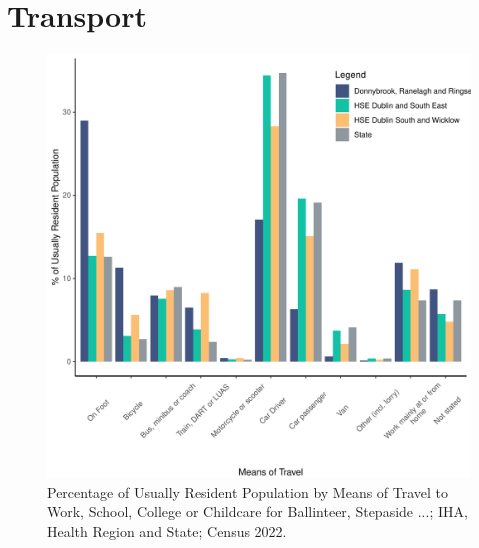 \documentclass{article}
\begin{document}
\section{Transport}\label{sect:Trans}
\begin{figure}[H]
	\centering
	\includegraphics[width = 120mm]{../figures/TravelED.pdf}
	\caption{Percentage of Usually Resident Population by Means of Travel to Work, School, College or Childcare for Ballinteer, Stepaside ...; IHA, Health Region and State; Census 2022.}
	\label{fig:vbnv}
	\end{figure}
\end{document}
